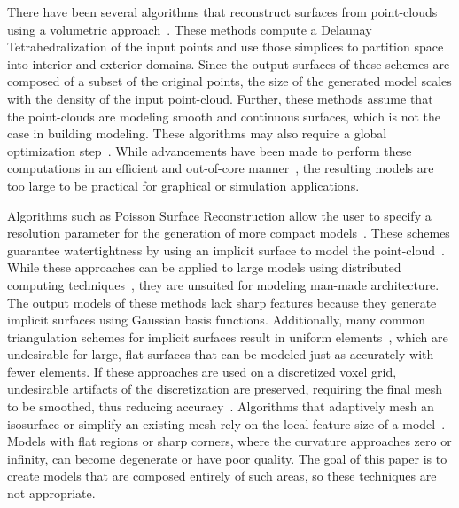 \documentclass[10pt,twocolumn,letterpaper]{article}
\begin{document}
There have been several algorithms that reconstruct surfaces from point-clouds using a volumetric approach~\cite{Powercrust,Eigencrust}.  These methods compute a Delaunay Tetrahedralization of the input points and use those simplices to partition space into interior and exterior domains.  Since the output surfaces of these schemes are composed of a subset of the original points, the size of the generated model scales with the density of the input point-cloud.  Further, these methods assume that the point-clouds are modeling smooth and continuous surfaces, which is not the case in building modeling.  These algorithms may also require a global optimization step~\cite{Eigencrust}.  While advancements have been made to perform these computations in an efficient and out-of-core manner~\cite{RealTimeEigenCrust,StreamingDelaunay}, the resulting models are too large to be practical for graphical or simulation applications.

Algorithms such as Poisson Surface Reconstruction allow the user to specify a resolution parameter for the generation of more compact models~\cite{Poisson}.  These schemes guarantee watertightness by using an implicit surface to model the point-cloud~\cite{UnorganizedPoints}.  While these approaches can be applied to large models using distributed computing techniques~\cite{OutOfCorePoisson,ParallelPoisson}, they are unsuited for modeling man-made architecture.  The output models of these methods lack sharp features because they generate implicit surfaces using Gaussian basis functions.  Additionally, many common triangulation schemes for implicit surfaces result in uniform elements~\cite{DualContouring,MarchingCubes}, which are undesirable for large, flat surfaces that can be modeled just as accurately with fewer elements.  If these approaches are used on a discretized voxel grid, undesirable artifacts of the discretization are preserved, requiring the final mesh to be smoothed, thus reducing accuracy~\cite{Carving}.  Algorithms that adaptively mesh an isosurface or simplify an existing mesh rely on the local feature size of a model~\cite{QEM,ProgressiveMesh,Isostuffing,AdaptiveMeshing}.  Models with flat regions or sharp corners, where the curvature approaches zero or infinity, can become degenerate or have poor quality.  The goal of this paper is to create models that are composed entirely of such areas, so these techniques are not appropriate.
\end{document}
